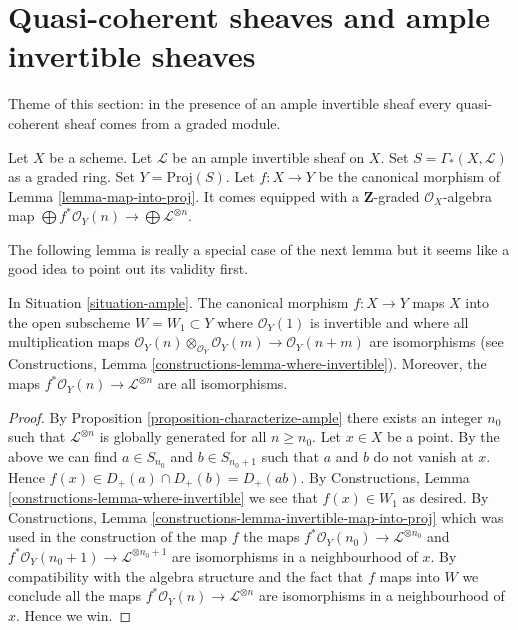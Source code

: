 \section{Quasi-coherent sheaves and ample invertible sheaves}
\label{section-ample-quasi-coherent}

\noindent
Theme of this section: in the presence of an ample invertible sheaf
every quasi-coherent sheaf comes from a graded module.

\begin{situation}
\label{situation-ample}
Let $X$ be a scheme.
Let $\mathcal{L}$ be an ample invertible sheaf on $X$.
Set $S = \Gamma_*(X, \mathcal{L})$ as a graded ring.
Set $Y = \text{Proj}(S)$.
Let $f : X \to Y$ be the canonical morphism of Lemma \ref{lemma-map-into-proj}.
It comes equipped with a $\mathbf{Z}$-graded $\mathcal{O}_X$-algebra map
$\bigoplus f^*\mathcal{O}_Y(n) \to \bigoplus \mathcal{L}^{\otimes n}$.
\end{situation}

\noindent
The following lemma is really a special case of the next lemma
but it seems like a good idea to point out its validity first.

\begin{lemma}
\label{lemma-ample-gcd-is-one}
In Situation \ref{situation-ample}.
The canonical morphism $f : X \to Y$
maps $X$ into the open subscheme $W = W_1 \subset Y$
where $\mathcal{O}_Y(1)$ is invertible and where
all multiplication maps
$\mathcal{O}_Y(n) \otimes_{\mathcal{O}_Y} \mathcal{O}_Y(m) \to
\mathcal{O}_Y(n + m)$
are isomorphisms (see
Constructions, Lemma \ref{constructions-lemma-where-invertible}).
Moreover, the maps $f^*\mathcal{O}_Y(n) \to \mathcal{L}^{\otimes n}$
are all isomorphisms.
\end{lemma}

\begin{proof}
By Proposition \ref{proposition-characterize-ample} there exists an integer
$n_0$ such that $\mathcal{L}^{\otimes n}$ is globally generated for all
$n \geq n_0$. Let $x \in X$ be a point. By the above we can find
$a \in S_{n_0}$ and $b \in S_{n_0 + 1}$ such that
$a$ and $b$ do not vanish at $x$. Hence
$f(x) \in D_{+}(a) \cap D_{+}(b) = D_{+}(ab)$. By
Constructions, Lemma \ref{constructions-lemma-where-invertible}
we see that $f(x) \in W_1$ as desired. By
Constructions, Lemma \ref{constructions-lemma-invertible-map-into-proj}
which was used in the construction of the map $f$
the maps
$f^*\mathcal{O}_Y(n_0) \to \mathcal{L}^{\otimes n_0}$ and
$f^*\mathcal{O}_Y(n_0 + 1) \to \mathcal{L}^{\otimes n_0 + 1}$
are isomorphisms in a neighbourhood of $x$. By compatibility with
the algebra structure and the fact that $f$ maps into $W$
we conclude all the maps
$f^*\mathcal{O}_Y(n) \to \mathcal{L}^{\otimes n}$ are isomorphisms
in a neighbourhood of $x$. Hence we win.
\end{proof}

